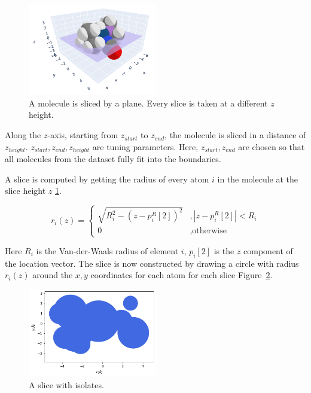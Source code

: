 \begin{figure} [h]
  \centering
  \includegraphics[width=0.5\textwidth]{figures/fourier/slice3D.png} %
  \caption{A molecule is sliced by a plane. Every slice is taken at a different $z$ height.}
  \label{fig:slice3D}
\end{figure}

Along the $z$-axis, starting from $z_{start}$ to $z_{end}$, the molecule is sliced in a distance of $z_{height}$.
$z_{start}, z_{end}, z_{height}$ are tuning parameters.
Here, $z_{start}, z_{end}$ are chosen so that all molecules from the dataset fully fit into the boundaries.

A slice is computed by getting the radius of every atom $i$ in the molecule at the slice height $z$ \ref{fig:slice3D}.

$$ r_i(z) =\left\{\begin{array}{ll} \sqrt{R_i^2 - (z - p_i^R[2])^2} &, | z - p_i^R[2] |  < R_i\\
  0 &, \text{otherwise}\end{array}\right.
$$ %

Here $R_i$ is the Van-der-Waals radius of element $i$, $p_i[2]$ is the $z$ component of the location vector.
The slice is now constructed by drawing a circle with radius $r_i(z)$ around the $x,y$ coordinates for each atom for each slice Figure~\ref{fig:slice}.

\begin{figure} [h]
  \centering
  \includegraphics[width=0.5\textwidth]{figures/fourier/slice-iso.png} %
  \caption{A slice with isolates.}
  \label{fig:slice}
\end{figure}

